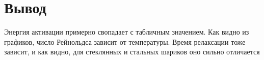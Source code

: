 \documentclass[11pt,a4paper]{article}
\begin{document}
\section*{Вывод}
Энергия активации примерно свопадает с табличным значением.
Как видно из графиков, число Рейнольдса зависит от температуры.
Время релаксации тоже зависит, и как видно, для стеклянных и стальных шариков оно сильно отличается
\end{document}
